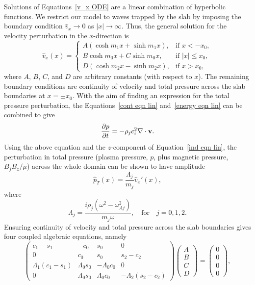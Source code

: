 \documentclass[12pt]{../style-files/ociamthesis}
\begin{document}
Solutions of Equations~\eqref{v_x ODE} are a linear combination of hyperbolic functions. We restrict our model to waves trapped by the slab by imposing the boundary condition $\hat{v}_x \to 0$ as $|x| \to \infty$. Thus, the general solution for the velocity perturbation in the $x$-direction is
\begin{equation}
\hat{v}_x(x)=
\begin{cases}
A(\cosh{m_1x} + \sinh{m_1x}), & \text{if } x < -x_0, \\
B\cosh{m_0x} + C\sinh{m_0x}, & \text{if } |x| \leq {x_0}, \\
D(\cosh{m_2x} - \sinh{m_2x}), & \text{if  } x > x_0, 
\end{cases} \label{vsoln}
\end{equation}
where $A$, $B$, $C$, and $D$ are arbitrary constants (with respect to $x$). The remaining boundary conditions are continuity of velocity and total pressure across the slab boundaries at $x = \pm{x_0}$. With the aim of finding an expression for the total pressure perturbation, the Equations~\eqref{cont eqn lin} and~\eqref{energy eqn lin} can be combined to give
\begin{equation}
	\frac{\partial p}{\partial t} = - \rho_jc_i^2\nabla\cdot\mathbf{v}.
\end{equation}
Using the above equation and the $z$-component of Equation~\eqref{ind eqn lin}, the perturbation in total pressure (plasma pressure, $p$, plus magnetic pressure, $B_jB_z/\mu$) across the whole domain can be shown to have amplitude
\begin{equation}
\hat{p}_T(x) = \frac{\Lambda_j}{m_j}\hat{v}_x'(x),
\end{equation}
where
\begin{equation}
\Lambda_j = \frac{i\rho_j(\omega^2 - \omega_{Aj}^2)}{m_j\omega}, \quad \text{for} \quad j = 0, 1, 2. \label{Lambdas}
\end{equation}
Ensuring continuity of velocity and total pressure across the slab boundaries gives four coupled algebraic equations, namely
\begin{equation}
\left(
\begin{matrix}
c_1-s_1             &-c_0           &s_0            &0                   \\
0                   &c_0            &s_0            &s_2-c_2             \\
\Lambda_1(c_1-s_1)  &\Lambda_0s_0   &-\Lambda_0c_0  &0                   \\
0                   &\Lambda_0s_0   &\Lambda_0c_0   &-\Lambda_2(s_2-c_2)
\end{matrix}
\right)
\left(
\begin{matrix}
A \\
B \\
C \\
D
\end{matrix}
\right)
=
\left(
\begin{matrix}
0 \\
0 \\
0 \\
0
\end{matrix}
\right),
\label{coefmatrix}
\end{equation}
\end{document}
